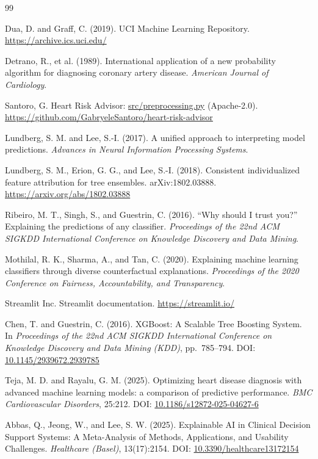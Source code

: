 \documentclass[11pt,a4paper]{article}
\begin{document}
\begin{thebibliography}{99}

Dua, D. and Graff, C. (2019).
\newblock UCI Machine Learning Repository.
\newblock \url{https://archive.ics.uci.edu/}

Detrano, R., et al. (1989).
\newblock International application of a new probability algorithm for diagnosing coronary artery disease.
\newblock \emph{American Journal of Cardiology}.

Santoro, G. Heart Risk Advisor: \url{src/preprocessing.py} (Apache-2.0).
\newblock \url{https://github.com/GabryeleSantoro/heart-risk-advisor}

Lundberg, S. M. and Lee, S.-I. (2017).
\newblock A unified approach to interpreting model predictions.
\newblock \emph{Advances in Neural Information Processing Systems}.

Lundberg, S. M., Erion, G. G., and Lee, S.-I. (2018).
\newblock Consistent individualized feature attribution for tree ensembles.
\newblock arXiv:1802.03888.
\newblock \url{https://arxiv.org/abs/1802.03888}

Ribeiro, M. T., Singh, S., and Guestrin, C. (2016).
\newblock ``Why should I trust you?'' Explaining the predictions of any classifier.
\newblock \emph{Proceedings of the 22nd ACM SIGKDD International Conference on Knowledge Discovery and Data Mining}.

Mothilal, R. K., Sharma, A., and Tan, C. (2020).
\newblock Explaining machine learning classifiers through diverse counterfactual explanations.
\newblock \emph{Proceedings of the 2020 Conference on Fairness, Accountability, and Transparency}.

Streamlit Inc. Streamlit documentation.
\newblock \url{https://streamlit.io/}

Chen, T. and Guestrin, C. (2016).
\newblock XGBoost: A Scalable Tree Boosting System.
\newblock In \emph{Proceedings of the 22nd ACM SIGKDD International Conference on Knowledge Discovery and Data Mining (KDD)}, pp.~785--794.
\newblock DOI: \href{https://doi.org/10.1145/2939672.2939785}{10.1145/2939672.2939785}

Teja, M. D. and Rayalu, G. M. (2025).
\newblock Optimizing heart disease diagnosis with advanced machine learning models: a comparison of predictive performance.
\newblock \emph{BMC Cardiovascular Disorders}, 25:212.
\newblock DOI: \href{https://doi.org/10.1186/s12872-025-04627-6}{10.1186/s12872-025-04627-6}

Abbas, Q., Jeong, W., and Lee, S. W. (2025).
\newblock Explainable AI in Clinical Decision Support Systems: A Meta-Analysis of Methods, Applications, and Usability Challenges.
\newblock \emph{Healthcare (Basel)}, 13(17):2154.
\newblock DOI: \href{https://doi.org/10.3390/healthcare13172154}{10.3390/healthcare13172154}

\end{thebibliography}
\end{document}

